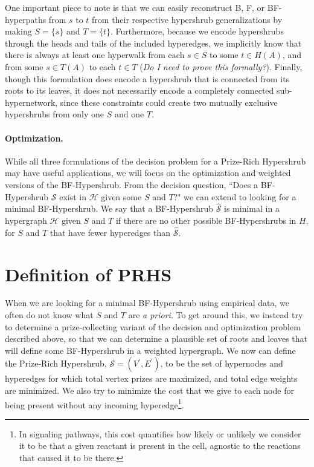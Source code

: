 \documentclass[12pt,twoside]{reedthesis}
\theoremstyle{definition}
\begin{document}
One important piece to note is that we can easily reconstruct B, F, or BF-hyperpaths from $s$ to $t$ from their respective hypershrub generalizations by making $S=\{s\}$ and $T=\{t\}$. Furthermore, because we encode hypershrubs through the heads and tails of the included hyperedges, we implicitly know that there is always at least one hyperwalk from each $s \in S$ to some $t \in H(A)$, and from some $s \in T(A)$ to each $t \in T$ (\emph{Do I need to prove this formally?}). Finally, though this formulation does encode a hypershrub that is connected from its roots to its leaves, it does not necessarily encode a completely connected sub-hypernetwork, since these constraints could create two mutually exclusive hypershrubs from only one $S$ and one $T$.

\paragraph{Optimization.}While all three formulations of the decision problem for a Prize-Rich Hypershrub may have useful applications, we will focus on the optimization and weighted versions of the BF-Hypershrub. From the decision question, ``Does a BF-Hypershrub $\mathcal{S}$ exist in $\mathcal{H}$ given some $S$ and $T$?" we can extend to looking for a minimal BF-Hypershrub. We say that a BF-Hypershrub $\hat{\mathcal{S}}$ is minimal in a hypergraph $\mathcal{H}$ given $S$ and $T$ if there are no other possible BF-Hypershrubs in $H$, for $S$ and $T$ that have fewer hyperedges than $\hat{\mathcal{S}}$.\par

\section{Definition of PRHS}

When we are looking for a minimal BF-Hypershrub using empirical data, we often do not know what $S$ and $T$ are \textit{a priori}. To get around this, we instead try to determine a prize-collecting variant of the decision and optimization problem described above, so that we can determine a plausible set of roots and leaves that will define some BF-Hypershrub in a weighted hypergraph. We now can define the Prize-Rich Hypershrub, $\mathcal{S} = (V^\prime,E^\prime)$, to be the set of hypernodes and hyperedges for which total vertex prizes are maximized, and total edge weights are minimized. We also try to minimize the cost that we give to each node for being present without any incoming hyperedge\footnote{In signaling pathways, this cost quantifies how likely or unlikely we consider it to be that a given reactant is present in the cell, agnostic to the reactions that caused it to be there.}.
\end{document}
